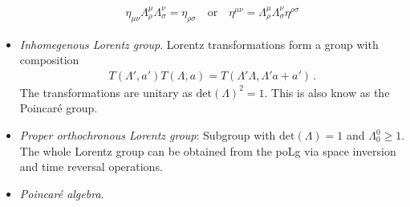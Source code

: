 \documentclass[12pt,a4paper]{article}
\begin{document}
\begin{itemize}
\begin{align}
\eta_{\mu \nu} \Lambda^\mu_\rho \Lambda^\nu_\sigma = \eta_{\rho \sigma} 
\quad \text{or} \quad \eta^{\mu \nu} = \Lambda^\mu_\rho \Lambda_\sigma^\nu \eta^{\rho \sigma}
\end{align}
\item \textit{Inhomegenous Lorentz group}. Lorentz transformations form a group with composition
\begin{align}
T(\Lambda',a') T(\Lambda,a) = T(\Lambda' \Lambda, \Lambda'a + a') \,.
\end{align}
The transformations are unitary as $\text{det}(\Lambda)^2 =1$. This is also know as the Poincar\'e group.
\item \textit{Proper orthochronous Lorentz group}: Subgroup with $\text{det}(\Lambda)=1$ and $\Lambda^0_0 \ge 1$. The whole Lorentz group can be obtained from the poLg via space  inversion and time reversal operations.
\item \textit{Poincar\'e algebra}. 
\end{itemize}
\end{document}
